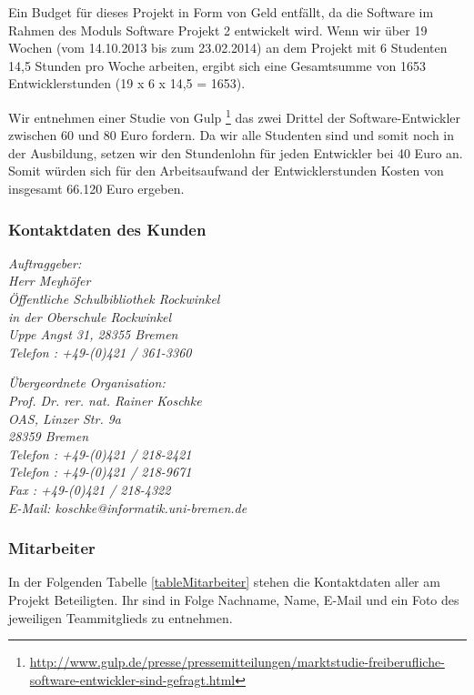 \documentclass[fontsize=12pt,paper=a4,twoside]{scrartcl}
\begin{document}
Ein Budget für dieses Projekt in Form von Geld entfällt, da die Software im Rahmen des Moduls Software Projekt 2 entwickelt wird. Wenn wir über 19 Wochen (vom 14.10.2013 bis zum 23.02.2014) an dem Projekt mit 6 Studenten 14,5 Stunden pro Woche arbeiten, ergibt sich eine Gesamtsumme von 1653 Entwicklerstunden (19 x 6 x 14,5 = 1653).

Wir entnehmen einer Studie von Gulp \footnote{\url{http://www.gulp.de/presse/pressemitteilungen/marktstudie-freiberufliche-software-entwickler-sind-gefragt.html}} das zwei Drittel der Software-Entwickler zwischen 60 und 80 Euro fordern. Da wir alle Studenten sind und somit noch in der Ausbildung, setzen wir den Stundenlohn für jeden Entwickler bei 40 Euro an. Somit würden sich für den Arbeitsaufwand der Entwicklerstunden Kosten von insgesamt 66.120 Euro ergeben.

\subsubsection{Kontaktdaten des Kunden}

{\em Auftraggeber:\\
	Herr Meyhöfer\\
	Öffentliche Schulbibliothek Rockwinkel\\
	in der Oberschule Rockwinkel\\
	Uppe Angst 31, 28355 Bremen\\
	Telefon : +49-(0)421 / 361-3360\\
}

{\em Übergeordnete Organisation:\\ 
	Prof. Dr. rer. nat. Rainer Koschke\\
	OAS, Linzer Str. 9a\\
	28359 Bremen\\
	Telefon : +49-(0)421 / 218-2421\\
	Telefon : +49-(0)421 / 218-9671\\
	Fax : +49-(0)421 / 218-4322\\
	E-Mail: koschke@informatik.uni-bremen.de
}

\newpage

\subsubsection{Mitarbeiter}\label{sec:Mitarbeiter}

In der Folgenden Tabelle \ref{tableMitarbeiter} stehen die Kontaktdaten aller am Projekt Beteiligten. Ihr sind in Folge Nachname, Name, E-Mail und ein Foto des jeweiligen Teammitglieds zu entnehmen.
\end{document}
